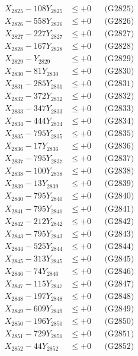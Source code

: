\documentclass[a4paper,10pt]{article}
\begin{document}
{\begin{align}
X_{2825} - 108Y_{2825} &\leq +0 && \text{(G2825)} \\
X_{2826} - 558Y_{2826} &\leq +0 && \text{(G2826)} \\
X_{2827} - 227Y_{2827} &\leq +0 && \text{(G2827)} \\
X_{2828} - 167Y_{2828} &\leq +0 && \text{(G2828)} \\
X_{2829} - Y_{2829} &\leq +0 && \text{(G2829)} \\
X_{2830} - 81Y_{2830} &\leq +0 && \text{(G2830)} \\
\allowbreak
X_{2831} - 285Y_{2831} &\leq +0 && \text{(G2831)} \\
X_{2832} - 372Y_{2832} &\leq +0 && \text{(G2832)} \\
X_{2833} - 347Y_{2833} &\leq +0 && \text{(G2833)} \\
X_{2834} - 444Y_{2834} &\leq +0 && \text{(G2834)} \\
X_{2835} - 795Y_{2835} &\leq +0 && \text{(G2835)} \\
X_{2836} - 17Y_{2836} &\leq +0 && \text{(G2836)} \\
X_{2837} - 795Y_{2837} &\leq +0 && \text{(G2837)} \\
X_{2838} - 100Y_{2838} &\leq +0 && \text{(G2838)} \\
X_{2839} - 13Y_{2839} &\leq +0 && \text{(G2839)} \\
X_{2840} - 795Y_{2840} &\leq +0 && \text{(G2840)} \\
\allowbreak
X_{2841} - 795Y_{2841} &\leq +0 && \text{(G2841)} \\
X_{2842} - 212Y_{2842} &\leq +0 && \text{(G2842)} \\
X_{2843} - 795Y_{2843} &\leq +0 && \text{(G2843)} \\
X_{2844} - 525Y_{2844} &\leq +0 && \text{(G2844)} \\
X_{2845} - 313Y_{2845} &\leq +0 && \text{(G2845)} \\
X_{2846} - 74Y_{2846} &\leq +0 && \text{(G2846)} \\
X_{2847} - 115Y_{2847} &\leq +0 && \text{(G2847)} \\
X_{2848} - 197Y_{2848} &\leq +0 && \text{(G2848)} \\
X_{2849} - 609Y_{2849} &\leq +0 && \text{(G2849)} \\
X_{2850} - 196Y_{2850} &\leq +0 && \text{(G2850)} \\
\allowbreak
X_{2851} - 729Y_{2851} &\leq +0 && \text{(G2851)} \\
X_{2852} - 44Y_{2852} &\leq +0 && \text{(G2852)} \\

\end{align}}
\end{document}
